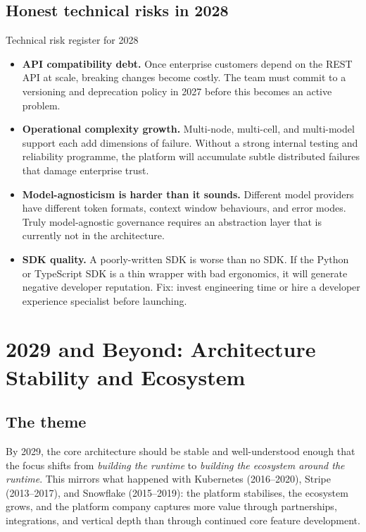 \subsection{Honest technical risks in 2028}

\begin{warnbox}{Technical risk register for 2028}
\begin{itemize}[noitemsep,leftmargin=1.4em]
  \item \textbf{API compatibility debt.} Once enterprise customers depend on
        the REST API at scale, breaking changes become costly. The team must
        commit to a versioning and deprecation policy in 2027 before this
        becomes an active problem.
  \item \textbf{Operational complexity growth.} Multi-node, multi-cell, and
        multi-model support each add dimensions of failure. Without a strong
        internal testing and reliability programme, the platform will accumulate
        subtle distributed failures that damage enterprise trust.
  \item \textbf{Model-agnosticism is harder than it sounds.} Different model
        providers have different token formats, context window behaviours, and
        error modes. Truly model-agnostic governance requires an abstraction
        layer that is currently not in the architecture.
  \item \textbf{SDK quality.} A poorly-written SDK is worse than no SDK. If the
        Python or TypeScript SDK is a thin wrapper with bad ergonomics, it will
        generate negative developer reputation. Fix: invest engineering time or
        hire a developer experience specialist before launching.
\end{itemize}
\end{warnbox}

\section{2029 and Beyond: Architecture Stability and Ecosystem}

\subsection{The theme}

By 2029, the core architecture should be stable and well-understood enough that
the focus shifts from \textit{building the runtime} to
\textit{building the ecosystem around the runtime}. This mirrors what happened
with Kubernetes (2016--2020), Stripe (2013--2017), and Snowflake (2015--2019):
the platform stabilises, the ecosystem grows, and the platform company captures
more value through partnerships, integrations, and vertical depth than through
continued core feature development.

